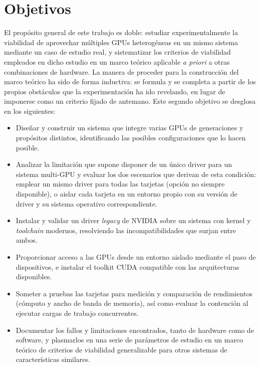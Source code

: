 \section*{Objetivos}

El propósito general de este trabajo es doble: estudiar experimentalmente la viabilidad de 
aprovechar múltiples GPUs heterogéneas en un mismo sistema mediante un caso de estudio real, 
y sistematizar los criterios de viabilidad empleados en dicho estudio en un marco teórico 
aplicable \textit{a priori} a otras combinaciones de hardware. La manera de proceder para la construcción del marco teórico 
ha sido de forma 
inductiva: se formula y se completa a partir de los propios obstáculos que la experimentación 
ha ido revelando, en lugar de imponerse como un criterio fijado de antemano. Este segundo objetivo 
se desglosa en los siguientes:
\begin{itemize}
    \item Diseñar y construir un sistema que integre varias GPUs de generaciones y propósitos distintos,
     identificando las posibles configuraciones que lo hacen posible.

    \item Analizar la limitación que supone disponer de un único driver para un sistema multi-GPU y evaluar los dos escenarios que 
    derivan de esta condición: emplear un mismo driver para todas las tarjetas (opción no siempre disponible), o aislar cada tarjeta en un entorno 
    propio con su versión de driver y su sistema operativo correspondiente.

    \item Instalar y validar un driver \textit{legacy} de NVIDIA sobre un sistema con 
    kernel y \textit{toolchain} modernos, resolviendo las incompatibilidades que surjan 
    entre ambos.

    \item Proporcionar acceso a las GPUs desde un entorno aislado mediante el paso de 
    dispositivos, e instalar el toolkit CUDA compatible con las arquitecturas disponibles.

    \item Someter a pruebas las tarjetas para medición y comparación de rendimientos (cómputo y ancho de banda de memoria), así como evaluar la 
    contención al ejecutar cargas de trabajo concurrentes.

    \item Documentar los fallos y limitaciones encontrados, tanto de hardware como de 
    software, y plasmarlos en una serie de parámetros de estudio en un marco teórico de criterios de viabilidad  
    generalizable para otros sistemas de características similares.
\end{itemize}

